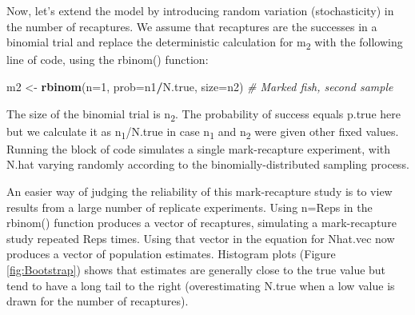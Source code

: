 \documentclass[
]{krantz}
\makeatletter
\newenvironment{Shaded}{\begin{snugshade}}{\end{snugshade}}
\newcommand{\AttributeTok}[1]{\textcolor[rgb]{0.27,0.27,0.27}{#1}}
\newcommand{\CommentTok}[1]{\textcolor[rgb]{0.37,0.37,0.37}{\textit{#1}}}
\newcommand{\DecValTok}[1]{\textcolor[rgb]{0.06,0.06,0.06}{#1}}
\newcommand{\FunctionTok}[1]{\textcolor[rgb]{0.27,0.27,0.27}{\textbf{#1}}}
\newcommand{\NormalTok}[1]{#1}
\newcommand{\OtherTok}[1]{\textcolor[rgb]{0.37,0.37,0.37}{#1}}
\newcommand{\SpecialCharTok}[1]{\textcolor[rgb]{0.43,0.43,0.43}{\textbf{#1}}}
\newenvironment{kframe}{%
\medskip{}
\setlength{\fboxsep}{.8em}
 \def\at@end@of@kframe{}%
 \ifinner\ifhmode%
  \def\at@end@of@kframe{\end{minipage}}%
  \begin{minipage}{\columnwidth}%
 \fi\fi%
 \def\FrameCommand##1{\hskip\@totalleftmargin \hskip-\fboxsep
 \colorbox{shadecolor}{##1}\hskip-\fboxsep
     \hskip-\linewidth \hskip-\@totalleftmargin \hskip\columnwidth}%
 \MakeFramed {\advance\hsize-\width
   \@totalleftmargin\z@ \linewidth\hsize
   \@setminipage}}%
 {\par\unskip\endMakeFramed%
 \at@end@of@kframe}
\renewenvironment{Shaded}{\begin{kframe}}{\end{kframe}}
\makeatother
\begin{document}
Now, let's extend the model by introducing random variation (stochasticity) in the number of recaptures. We assume that recaptures are the successes in a binomial trial and replace the deterministic calculation for m\textsubscript{2} with the following line of code, using the rbinom() function:

\begin{Shaded}
\begin{Highlighting}[]
\NormalTok{m2 }\OtherTok{\textless{}{-}} \FunctionTok{rbinom}\NormalTok{(}\AttributeTok{n=}\DecValTok{1}\NormalTok{, }\AttributeTok{prob=}\NormalTok{n1}\SpecialCharTok{/}\NormalTok{N.true, }\AttributeTok{size=}\NormalTok{n2) }\CommentTok{\# Marked fish, second sample}
\end{Highlighting}
\end{Shaded}

The size of the binomial trial is n\textsubscript{2}. The probability of success equals p.true here but we calculate it as n\textsubscript{1}/N.true in case n\textsubscript{1} and n\textsubscript{2} were given other fixed values. Running the block of code simulates a single mark-recapture experiment, with N.hat varying randomly according to the binomially-distributed sampling process.

An easier way of judging the reliability of this mark-recapture study is to view results from a large number of replicate experiments. Using n=Reps in the rbinom() function produces a vector of recaptures, simulating a mark-recapture study repeated Reps times. Using that vector in the equation for Nhat.vec now produces a vector of population estimates. Histogram plots (Figure \ref{fig:Bootstrap}) shows that estimates are generally close to the true value but tend to have a long tail to the right (overestimating N.true when a low value is drawn for the number of recaptures).
\end{document}
